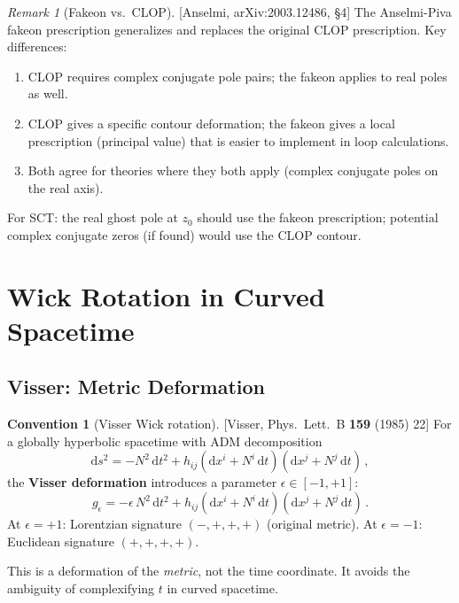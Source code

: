 \documentclass[12pt,a4paper]{article}
\theoremstyle{definition}
\newtheorem{convention}[proposition]{Convention}
\theoremstyle{remark}
\newtheorem{remark}[proposition]{Remark}
\newcommand{\dd}{\mathrm{d}}
\newcommand{\fromlit}[1]{\textcolor{blue!70!black}{\textsf{[#1]}}}
\begin{document}
\begin{remark}[Fakeon vs.\ CLOP]
\label{rem:fakeon-vs-clop}
\fromlit{Anselmi, arXiv:2003.12486, \S4}
The Anselmi-Piva fakeon prescription generalizes and replaces the
original CLOP prescription.  Key differences:
\begin{enumerate}[nosep,label=(\roman*)]
  \item CLOP requires complex conjugate pole pairs; the fakeon applies
    to real poles as well.
  \item CLOP gives a specific contour deformation; the fakeon gives a
    local prescription (principal value) that is easier to implement in
    loop calculations.
  \item Both agree for theories where they both apply (complex
    conjugate poles on the real axis).
\end{enumerate}
For SCT: the real ghost pole at $z_0$ should use the fakeon
prescription; potential complex conjugate zeros (if found) would use
the CLOP contour.
\end{remark}


\section{Wick Rotation in Curved Spacetime}
\label{sec:wick}

\subsection{Visser: Metric Deformation}

\begin{convention}[Visser Wick rotation]
\label{conv:visser}
\fromlit{Visser, Phys.\ Lett.\ B \textbf{159} (1985) 22}
For a globally hyperbolic spacetime with ADM decomposition
\begin{equation}
  \dd s^2 = -N^2\,\dd t^2 + h_{ij}(\dd x^i + N^i\,\dd t)
    (\dd x^j + N^j\,\dd t)\,,
\end{equation}
the \textbf{Visser deformation} introduces a parameter
$\epsilon \in [-1, +1]$:
\begin{equation}\label{eq:visser}
  g_\epsilon = -\epsilon\, N^2\,\dd t^2
    + h_{ij}(\dd x^i + N^i\,\dd t)(\dd x^j + N^j\,\dd t)\,.
\end{equation}
At $\epsilon = +1$: Lorentzian signature $(-,+,+,+)$ (original metric).
At $\epsilon = -1$: Euclidean signature $(+,+,+,+)$.

This is a deformation of the \emph{metric}, not the time coordinate.
It avoids the ambiguity of complexifying $t$ in curved spacetime.
\end{convention}
\end{document}
